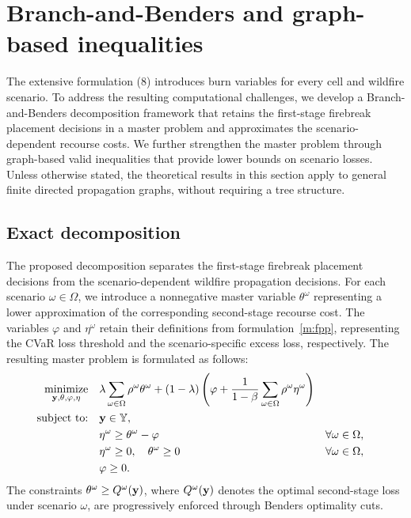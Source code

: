 \documentclass{itor}
\begin{document}
\section{Branch-and-Benders and graph-based inequalities}
\label{sec:branch_benders}

The extensive formulation (8) introduces burn variables for every cell and wildfire scenario. To address the resulting computational challenges, we develop a Branch-and-Benders decomposition framework that retains the first-stage firebreak placement decisions in a master problem and approximates the scenario-dependent recourse costs. We further strengthen the master problem through graph-based valid inequalities that provide lower bounds on scenario losses. Unless otherwise stated, the theoretical results in this section apply to general finite directed propagation graphs, without requiring a tree structure.

\subsection{Exact decomposition}
\label{subsec:exact_decomposition}

The proposed decomposition separates the first-stage firebreak placement decisions from the scenario-dependent wildfire propagation decisions. For each scenario $\omega \in \Omega$, we introduce a nonnegative master variable $\theta^\omega$ representing a lower approximation of the corresponding second-stage recourse cost. The variables $\varphi$ and $\eta^\omega$ retain their definitions from formulation~\eqref{m:fpp}, representing the CVaR loss threshold and the scenario-specific excess loss, respectively. The resulting master problem is formulated as follows:
\begin{equation}
\label{m:fpp_bd}
\begin{aligned}
\underset{\vb{y},\vb{\theta},\varphi,\vb{\eta}}{\text{minimize}}
\quad &
\lambda \sum_{\omega \in \Omega} \rho^\omega \theta^\omega
+ (1-\lambda)
\left(
\varphi + \frac{1}{1-\beta}
\sum_{\omega \in \Omega} \rho^\omega \eta^\omega
\right)\\
\text{subject to:}\quad
& \vb{y} \in \mathbb{Y},\\
& \eta^\omega \geq \theta^\omega - \varphi
&& \forall \omega \in \Omega,\\
& \eta^\omega \geq 0,\quad \theta^\omega \geq 0
&& \forall \omega \in \Omega,\\
& \varphi \geq 0.
\end{aligned}
\end{equation}
The constraints $\theta^\omega \geq Q^\omega(\vb{y})$, where $Q^\omega(\vb{y})$ denotes the optimal second-stage loss under scenario $\omega$, are progressively enforced through Benders optimality cuts.
\end{document}
